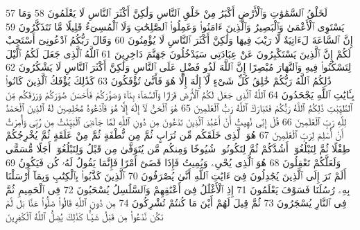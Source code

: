 {\tiny\colorbox{cl_aya}{57}} لَخَلْقُ ٱلسَّمَٰوَٰتِ وَٱلْأَرْضِ أَكْبَرُ مِنْ خَلْقِ ٱلنَّاسِ وَلَٰكِنَّ أَكْثَرَ ٱلنَّاسِ لَا يَعْلَمُونَ
{\tiny\colorbox{cl_aya}{58}} وَمَا يَسْتَوِى ٱلْأَعْمَىٰ وَٱلْبَصِيرُ وَٱلَّذِينَ ءَامَنُوا۟ وَعَمِلُوا۟ ٱلصَّٰلِحَٰتِ وَلَا ٱلْمُسِىٓءُ قَلِيلًا مَّا تَتَذَكَّرُونَ
{\tiny\colorbox{cl_aya}{59}} إِنَّ ٱلسَّاعَةَ لَءَاتِيَةٌ لَّا رَيْبَ فِيهَا وَلَٰكِنَّ أَكْثَرَ ٱلنَّاسِ لَا يُؤْمِنُونَ
{\tiny\colorbox{cl_aya}{60}} وَقَالَ رَبُّكُمُ ٱدْعُونِىٓ أَسْتَجِبْ لَكُمْ إِنَّ ٱلَّذِينَ يَسْتَكْبِرُونَ عَنْ عِبَادَتِى سَيَدْخُلُونَ جَهَنَّمَ دَاخِرِينَ
{\tiny\colorbox{cl_aya}{61}} ٱللَّهُ ٱلَّذِى جَعَلَ لَكُمُ ٱلَّيْلَ لِتَسْكُنُوا۟ فِيهِ وَٱلنَّهَارَ مُبْصِرًا إِنَّ ٱللَّهَ لَذُو فَضْلٍ عَلَى ٱلنَّاسِ وَلَٰكِنَّ أَكْثَرَ ٱلنَّاسِ لَا يَشْكُرُونَ
{\tiny\colorbox{cl_aya}{62}} ذَٰلِكُمُ ٱللَّهُ رَبُّكُمْ خَٰلِقُ كُلِّ شَىْءٍ لَّآ إِلَٰهَ إِلَّا هُوَ فَأَنَّىٰ تُؤْفَكُونَ
{\tiny\colorbox{cl_aya}{63}} كَذَٰلِكَ يُؤْفَكُ ٱلَّذِينَ كَانُوا۟ بِـَٔايَٰتِ ٱللَّهِ يَجْحَدُونَ
{\tiny\colorbox{cl_aya}{64}} ٱللَّهُ ٱلَّذِى جَعَلَ لَكُمُ ٱلْأَرْضَ قَرَارًا وَٱلسَّمَآءَ بِنَآءً وَصَوَّرَكُمْ فَأَحْسَنَ صُوَرَكُمْ وَرَزَقَكُم مِّنَ ٱلطَّيِّبَٰتِ ذَٰلِكُمُ ٱللَّهُ رَبُّكُمْ فَتَبَارَكَ ٱللَّهُ رَبُّ ٱلْعَٰلَمِينَ
{\tiny\colorbox{cl_aya}{65}} هُوَ ٱلْحَىُّ لَآ إِلَٰهَ إِلَّا هُوَ فَٱدْعُوهُ مُخْلِصِينَ لَهُ ٱلدِّينَ ٱلْحَمْدُ لِلَّهِ رَبِّ ٱلْعَٰلَمِينَ
{\tiny\colorbox{cl_aya}{66}} قُلْ إِنِّى نُهِيتُ أَنْ أَعْبُدَ ٱلَّذِينَ تَدْعُونَ مِن دُونِ ٱللَّهِ لَمَّا جَآءَنِىَ ٱلْبَيِّنَٰتُ مِن رَّبِّى وَأُمِرْتُ أَنْ أُسْلِمَ لِرَبِّ ٱلْعَٰلَمِينَ
{\tiny\colorbox{cl_aya}{67}} هُوَ ٱلَّذِى خَلَقَكُم مِّن تُرَابٍ ثُمَّ مِن نُّطْفَةٍ ثُمَّ مِنْ عَلَقَةٍ ثُمَّ يُخْرِجُكُمْ طِفْلًا ثُمَّ لِتَبْلُغُوٓا۟ أَشُدَّكُمْ ثُمَّ لِتَكُونُوا۟ شُيُوخًا وَمِنكُم مَّن يُتَوَفَّىٰ مِن قَبْلُ وَلِتَبْلُغُوٓا۟ أَجَلًا مُّسَمًّى وَلَعَلَّكُمْ تَعْقِلُونَ
{\tiny\colorbox{cl_aya}{68}} هُوَ ٱلَّذِى يُحْىِۦ وَيُمِيتُ فَإِذَا قَضَىٰٓ أَمْرًا فَإِنَّمَا يَقُولُ لَهُۥ كُن فَيَكُونُ
{\tiny\colorbox{cl_aya}{69}} أَلَمْ تَرَ إِلَى ٱلَّذِينَ يُجَٰدِلُونَ فِىٓ ءَايَٰتِ ٱللَّهِ أَنَّىٰ يُصْرَفُونَ
{\tiny\colorbox{cl_aya}{70}} ٱلَّذِينَ كَذَّبُوا۟ بِٱلْكِتَٰبِ وَبِمَآ أَرْسَلْنَا بِهِۦ رُسُلَنَا فَسَوْفَ يَعْلَمُونَ
{\tiny\colorbox{cl_aya}{71}} إِذِ ٱلْأَغْلَٰلُ فِىٓ أَعْنَٰقِهِمْ وَٱلسَّلَٰسِلُ يُسْحَبُونَ
{\tiny\colorbox{cl_aya}{72}} فِى ٱلْحَمِيمِ ثُمَّ فِى ٱلنَّارِ يُسْجَرُونَ
{\tiny\colorbox{cl_aya}{73}} ثُمَّ قِيلَ لَهُمْ أَيْنَ مَا كُنتُمْ تُشْرِكُونَ
{\tiny\colorbox{cl_aya}{74}} مِن دُونِ ٱللَّهِ قَالُوا۟ ضَلُّوا۟ عَنَّا بَل لَّمْ نَكُن نَّدْعُوا۟ مِن قَبْلُ شَيْـًٔا كَذَٰلِكَ يُضِلُّ ٱللَّهُ ٱلْكَٰفِرِينَ
